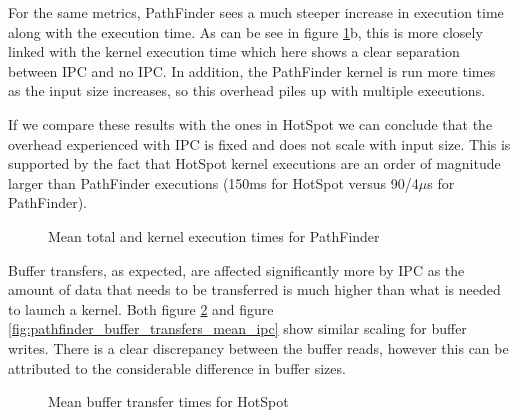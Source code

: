 For the same metrics, PathFinder sees a much steeper increase in execution time along with the execution time. As can be see in figure \ref{fig:pathfinder_total_and_kernel_executions_mean_ipc}b, this is more closely linked with the kernel execution time which here shows a clear separation between IPC and no IPC. In addition, the PathFinder kernel is run more times as the input size increases, so this overhead piles up with multiple executions.

If we compare these results with the ones in HotSpot we can conclude that the overhead experienced with IPC is fixed and does not scale with input size. This is supported by the fact that HotSpot kernel executions are an order of magnitude larger than PathFinder executions (150ms for HotSpot versus 90/4$\mu$s for PathFinder).

\begin{figure}%
    \centering
    \qquad
    \captionsetup{justification=centering}
    \caption{Mean total and kernel execution times for PathFinder}%
    \label{fig:pathfinder_total_and_kernel_executions_mean_ipc}%
\end{figure}

Buffer transfers, as expected, are affected significantly more by IPC as the amount of data that needs to be transferred is much higher than what is needed to launch a kernel. Both figure \ref{fig:hotspot_buffer_transfers_mean_ipc} and figure \ref{fig:pathfinder_buffer_transfers_mean_ipc} show similar scaling for buffer writes. There is a clear discrepancy between the buffer reads, however this can be attributed to the considerable difference in buffer sizes.


\begin{figure}%
    \centering
    \qquad
    \captionsetup{justification=centering}
    \caption{Mean buffer transfer times for HotSpot}%
    \label{fig:hotspot_buffer_transfers_mean_ipc}%
\end{figure}


